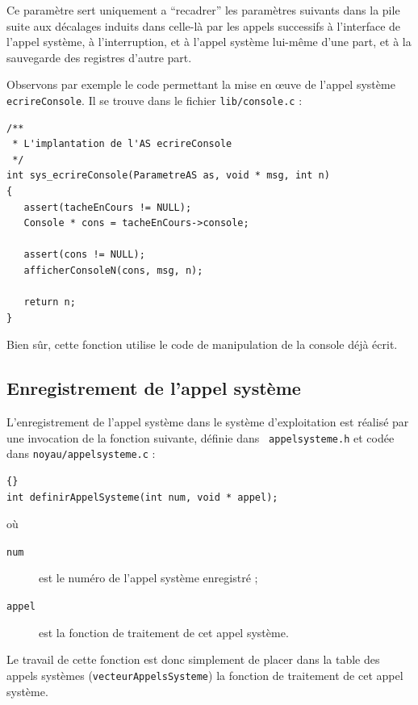    Ce paramètre sert uniquement a ``recadrer'' les paramètres suivants 
dans la pile suite aux décalages induits dans celle-là par les appels
successifs à l'interface de l'appel système, à l'interruption, et à
l'appel système lui-même d'une part, et à la sauvegarde des registres
d'autre part.

   Observons par exemple le code permettant la mise en \oe{}uve de
l'appel système \lstinline!ecrireConsole!. Il se trouve dans le
fichier {\tt lib/console.c} :

\begin{lstlisting}
/**
 * L'implantation de l'AS ecrireConsole
 */
int sys_ecrireConsole(ParametreAS as, void * msg, int n)
{
   assert(tacheEnCours != NULL);
   Console * cons = tacheEnCours->console;
   
   assert(cons != NULL);
   afficherConsoleN(cons, msg, n);

   return n; 
}
\end{lstlisting}

   Bien sûr, cette fonction utilise le code de manipulation de la
console déjà écrit.   

\subsection{Enregistrement de l'appel système}

   L'enregistrement de l'appel système dans le système d'exploitation est
réalisé par une invocation de la fonction suivante, définie dans {\tt
appelsysteme.h} et codée dans {\tt noyau/appelsysteme.c} :

\begin{lstlisting}{}
int definirAppelSysteme(int num, void * appel);
\end{lstlisting}

   où 

\begin{description}
   \item[\lstinline!num!] est le numéro de l'appel système enregistré ;
   \item[\lstinline!appel!] est la fonction de traitement de cet appel
système.
\end{description}

   Le travail de cette fonction est donc simplement de placer dans la
table des appels systèmes (\lstinline!vecteurAppelsSysteme!) la
fonction de traitement de cet appel système.

